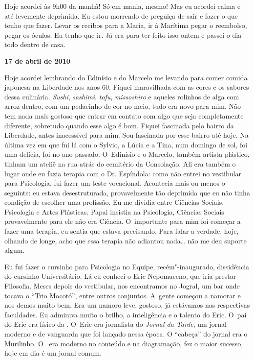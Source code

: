 Hoje acordei às 9h00 da manhã! Só em mania, mesmo! Mas eu acordei
calma e até levemente deprimida. Eu estou morrendo de preguiça de sair e
fazer o que tenho que fazer. Levar os recibos para a Maria, ir à
Marítima pegar o reembolso, pegar os óculos. Eu tenho que ir. Já era
para ter feito isso ontem e passei o dia todo dentro de casa.

\begin{flushright}\textbf{17 de abril de 2010}\end{flushright}


Hoje acordei lembrando do Edinísio e do Marcelo me levando para comer
comida japonesa na Liberdade nos anos 60. Fiquei maravilhada com as
cores e os sabores dessa culinária. \emph{Sushi}, \emph{sashimi},
\emph{tofu}, \emph{missoshiro} e aqueles rolinhos de alga com arroz
dentro, com um pedacinho de cor no meio, tudo era novo para mim. Não tem
nada mais gostoso que entrar em contato com algo que seja completamente
diferente, sobretudo quando esse algo é bom. Fiquei fascinada pelo
bairro da Liberdade, antes inacessível para mim. Sou fascinada por esse
bairro até hoje. Na última vez em que fui lá com o Sylvio, a Lúcia e a
Tina, num domingo de sol, foi uma delícia, foi no ano passado. O~Edinísio e o Marcelo, também artista plástico, tinham um ateliê na rua
atrás do cemitério da Consolação. Ali era também o lugar onde eu fazia
terapia com o Dr. Espíndola: como não entrei no vestibular para
Psicologia, fui fazer um teste vocacional. Acontecia mais ou menos o
seguinte: eu estava desestruturada, provavelmente tão deprimida que eu
não tinha condição de escolher uma profissão. Eu me dividia entre
Ciências Sociais, Psicologia e Artes Plásticas. Papai insistia na
Psicologia, Ciências Sociais provavelmente para ele não era Ciência. O~importante para mim foi começar a fazer uma terapia, eu sentia que
estava precisando. Para falar a verdade, hoje, olhando de longe, acho
que essa terapia não adiantou nada… não me deu suporte algum.

Eu fui fazer o cursinho para Psicologia no Equipe, recém"-inaugurado,
dissidência do cursinho Universitário. Lá eu conheci o Eric Nepomuceno,
que iria prestar Filosofia. Meses depois do vestibular, nos encontramos
no Jogral, um bar onde tocava o ``Trio Mocotó'', entre outros conjuntos.
A~gente começou a namorar e nos demos muito bem. Era um namoro leve,
gostoso, já estávamos nas respectivas faculdades. Eu admirava muito o
brilho, a inteligência e o talento do Eric. O~pai do Eric era físico da
. O~Eric era jornalista do \emph{Jornal da Tarde}, um jornal moderno
e de vanguarda que foi lançado nessa época. O ``cabeça'' do jornal era o
Murilinho. O~ era moderno no conteúdo e na diagramação, fez o maior
sucesso, hoje em dia é um jornal comum.

